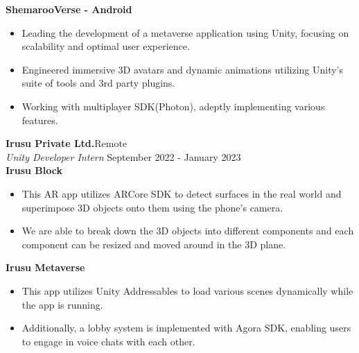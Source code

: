 \documentclass[a4paper]{article}
\begin{document}
\hspace{1.5em}\textbf{ShemarooVerse - Android} 
\begin{itemize} 
\vspace{-2.5mm}
        \item Leading the development of a metaverse application using Unity, focusing on scalability and optimal user experience.
 \vspace{-2.5mm}
       \item Engineered immersive 3D avatars  and dynamic animations utilizing Unity's suite of tools and 3rd party plugins.
 \vspace{-2.5mm}
       \item Working with multiplayer SDK(Photon), adeptly implementing various features.
 \end{itemize}
\vspace{1mm}

\textbf{Irusu Private Ltd.}\hfill Remote\\
{\textit {Unity Developer Intern}} \hfill September 2022 - January 2023 \\ 

\hspace{1.5em}\textbf{Irusu Block} 
\begin{itemize} 
\vspace{-2.5mm}
    \item This AR app utilizes ARCore SDK to detect surfaces in the real world and superimpose 3D objects onto them using the phone's camera.
 \vspace{-2.5mm}
    \item We are able to break down the 3D objects into different components and each component can be resized and moved around in the 3D plane.
 \vspace{-2.5mm}
\end{itemize}

\hspace{1em}\textbf{Irusu Metaverse} 
\begin{itemize} 
\vspace{-2.5mm}
    \item This app utilizes Unity Addressables to load various scenes dynamically while the app is running. 
 \vspace{-2.5mm}
    \item Additionally, a lobby system is implemented with Agora SDK, enabling users to engage in voice chats with each other.
 \vspace{-2.5mm}
\end{itemize}
\end{document}
